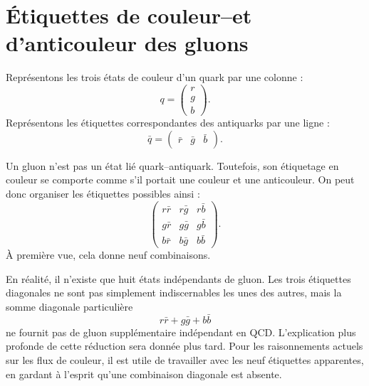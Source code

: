 \section{Étiquettes de couleur--et d’anticouleur des gluons}

Représentons les trois états de couleur d’un quark par une colonne :
\begin{equation}
q=
\begin{pmatrix}
r\\
g\\
b
\end{pmatrix}.
\end{equation}
Représentons les étiquettes correspondantes des antiquarks par une ligne :
\begin{equation}
\bar q=
\begin{pmatrix}
\bar r&\bar g&\bar b
\end{pmatrix}.
\end{equation}

Un gluon n’est pas un état lié quark--antiquark. Toutefois, son étiquetage en couleur se comporte comme s’il portait une couleur et une anticouleur. On peut donc organiser les étiquettes possibles ainsi :
\begin{equation}
\begin{pmatrix}
r\bar r&r\bar g&r\bar b\\
g\bar r&g\bar g&g\bar b\\
b\bar r&b\bar g&b\bar b
\end{pmatrix}.
\end{equation}
À première vue, cela donne neuf combinaisons.

\begin{classroomqa}
\end{classroomqa}

En réalité, il n’existe que huit états indépendants de gluon. Les trois étiquettes diagonales ne sont pas simplement indiscernables les unes des autres, mais la somme diagonale particulière
\begin{equation}
r\bar r+g\bar g+b\bar b
\end{equation}
ne fournit pas de gluon supplémentaire indépendant en QCD. L’explication plus profonde de cette réduction sera donnée plus tard. Pour les raisonnements actuels sur les flux de couleur, il est utile de travailler avec les neuf étiquettes apparentes, en gardant à l’esprit qu’une combinaison diagonale est absente.

